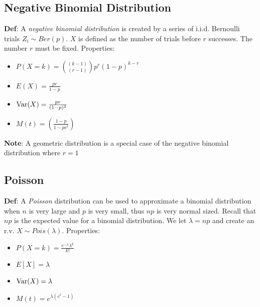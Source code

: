 \documentclass{article}
\newcommand{\var}{\textup{Var}}
\begin{document}
\subsection{Negative Binomial Distribution}

\textbf{Def}: A \emph{negative binomial distribution} is created by a series of i.i.d. Bernoulli trials $Z_i\sim Ber(p)$. $X$ is defined as the number of trials before $r$ successes. The number $r$ must be fixed. Properties:
\begin{itemize}
\item $P(X=k)=\displaystyle {(k-1) \choose (r-1)}p^r(1-p)^{k-r}$
\item $E(X)=\frac{pr}{1-p}$
\item $\var(X)=\frac{pr}{(1-p)^2}$
\item $M(t)=\left(\frac{1-p}{1-pe^t}\right)$
\end{itemize}

\textbf{Note}: A geometric distribution is a special case of the negative binomial distribution where $r=1$

\subsection{Poisson}

\textbf{Def}: A \emph{Poisson} distribution can be used to approximate a binomial distribution when $n$ is very large and $p$ is very small, thus $np$ is very normal sized. Recall that $np$ is the expected value for a binomial distribution. We let $\lambda=np$ and create an r.v. $X\sim Pois(\lambda)$. Properties:
\begin{itemize}
\item $\displaystyle P(X=k)=\frac{e^{-\lambda}\lambda^k}{k!}$
\item $E[X]=\lambda$
\item $\var(X)=\lambda$
\item $M(t)=e^{\lambda(e^t-1)}$
\end{itemize} 

\\\\
\end{document}
